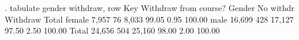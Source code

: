 . tabulate gender withdraw, row
{\smallskip}
{\TLC}
{\VBAR} Key            {\VBAR}
{\LFTT}
{\VBAR}   {}    {\VBAR}
{\VBAR} {} {\VBAR}
{\BLC}
{\smallskip}
           {\VBAR} Withdraw from course?
    Gender {\VBAR} No withdr   Withdraw {\VBAR}     Total
    female {\VBAR}     7,957         76 {\VBAR}     8,033 
           {\VBAR}     99.05       0.95 {\VBAR}    100.00 
      male {\VBAR}    16,699        428 {\VBAR}    17,127 
           {\VBAR}     97.50       2.50 {\VBAR}    100.00 
     Total {\VBAR}    24,656        504 {\VBAR}    25,160 
           {\VBAR}     98.00       2.00 {\VBAR}    100.00 
{\smallskip}
